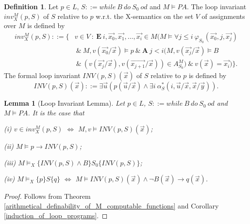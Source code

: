 \documentclass[a4paper,11pt]{article}
\begin{document}
\theoremstyle{definition}
\newtheorem{definition_of_loop_invariants}[satisfiability_of_asserted_programs_in_models]{Definition}
\begin{definition_of_loop_invariants}\label{definition_of_loop_invariants}
Let $p \in L$, $S ::= while\ B\ do\ S_0\ od$ and $M\models PA$. The loop invariant $inv_X^{M}(p,S)$ of $S$ relative to $p$ w.r.t. the X-semantics on the set $V$ of assignments over $M$ is defined by
\begin{align*}
  inv_X^{M}(p,S) ::= \{ & v\in V \ : \ \textbf{E}~i,\vec{x_0},\vec{x_1},\ldots,\vec{x_i}\in M ( M\models \forall j\leq i\ \varphi_{S_0}(\vec{x_0},j,\vec{x_j}) \\
                        & ~\&~ M,v(\vec{x_0}/\vec{x}) \models p ~\&~ \textbf{A}~ j < i ( M,v(\vec{x_j}/\vec{x})\models B \\
                        & ~\&~ (v(\vec{x_j}/\vec{x}), v(\vec{x_{j+1}}/\vec{x}) ) \in A_{S_0}^M ) ~\&~ v(\vec{x})= \vec{x_i} ) \}.
\end{align*}
The formal loop invariant $INV(p,S)(\vec{x})$ of $S$ relative to $p$ is defined by
\begin{equation*}
  INV(p,S)(\vec{x}) ::= \exists \vec{u} ( p(\vec{u}/\vec{x}) \wedge \exists i\ \alpha_S^*(i,\vec{u}/\vec{x},\vec{x}/\vec{y}) ).
\end{equation*}
\end{definition_of_loop_invariants}

\theoremstyle{plain}
\newtheorem{loop_invariant}[satisfiability_of_asserted_programs_in_models]{Lemma}
\begin{loop_invariant}[Loop Invariant Lemma]\label{loop_invariant}
Let $p \in L$, $S ::= while\ B\ do\ S_0\ od$ and $M\models PA$. It is the case that

(i) $v\in inv_X^{M}(p,S)$ $\Leftrightarrow$ $M,v\models INV(p,S)(\vec{x})$;

(ii) $M\models p\rightarrow INV(p,S)$;

(iii) $M \models_X \{INV(p,S) \wedge B\} S_0 \{INV(p,S)\}$;

(iv) $M\models_X \{p\}S\{q\}$ $\Leftrightarrow$ $M\models INV(p,S)(\vec{x}) \wedge \neg B(\vec{x}) \rightarrow q(\vec{x})$.
\end{loop_invariant}

\begin{proof}
  Follows from Theorem \ref{arithmetical_definability_of_M_computable_functions} and Corollary \ref{induction_of_loop_programs}.
\end{proof}
\end{document}
